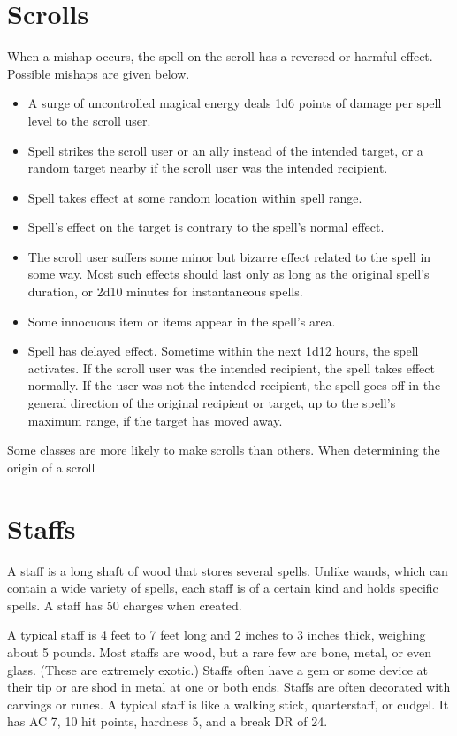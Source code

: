 \section{Scrolls}

 When a mishap occurs, the spell on the scroll has a reversed or harmful effect. Possible mishaps are given below.
\begin{itemize}
\item A surge of uncontrolled magical energy deals 1d6 points of damage per spell level to the scroll user.
\item Spell strikes the scroll user or an ally instead of the intended target, or a random target nearby if the scroll user was the intended recipient.
\item Spell takes effect at some random location within spell range.
\item Spell's effect on the target is contrary to the spell's normal effect.
\item The scroll user suffers some minor but bizarre effect related to the spell in some way. Most such effects should last only as long as the original spell's duration, or 2d10 minutes for instantaneous spells.
\item Some innocuous item or items appear in the spell's area.
\item Spell has delayed effect. Sometime within the next 1d12 hours, the spell activates. If the scroll user was the intended recipient, the spell takes effect normally. If the user was not the intended recipient, the spell goes off in the general direction of the original recipient or target, up to the spell's maximum range, if the target has moved away.
\end{itemize}

 Some classes are more likely to make scrolls than others. When determining the origin of a scroll

\section{Staffs}

A staff is a long shaft of wood that stores several spells. Unlike wands, which can contain a wide variety of spells, each staff is of a certain kind and holds specific spells. A staff has 50 charges when created.

 A typical staff is 4 feet to 7 feet long and 2 inches to 3 inches thick, weighing about 5 pounds. Most staffs are wood, but a rare few are bone, metal, or even glass. (These are extremely exotic.) Staffs often have a gem or some device at their tip or are shod in metal at one or both ends. Staffs are often decorated with carvings or runes. A typical staff is like a walking stick, quarterstaff, or cudgel. It has AC 7, 10 hit points, hardness 5, and a break DR of 24.

